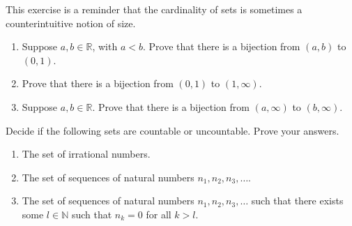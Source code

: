 \documentclass[12pt,letterpaper,reqno]{amsart}
\numberwithin{equation}{section}
\newcommand{\R}{\ensuremath{\mathbb R}}
\begin{document}
\begin{exercise}[5 points] This exercise is a reminder that the cardinality of sets is sometimes a counterintuitive notion of size.

\begin{enumerate}
 
 \item
Suppose $a, b \in \R$, with $a < b$.
Prove that there is a bijection from $(a,b)$ to $(0,1)$.

\item Prove that there is a bijection from $(0,1)$ to $(1,\infty)$.

\item Suppose $a,b \in \R$. 
Prove that there is a bijection from $(a,\infty)$ to $(b,\infty)$.
\end{enumerate}
\end{exercise}


\begin{exercise}[10 points]
Decide if the following sets are countable or uncountable. Prove your answers.
\begin{enumerate}
\item The set of irrational numbers.
\item The set of sequences of natural numbers $n_1,n_2,n_3,\dots$.
\item The set of sequences of natural numbers $n_1,n_2,n_3,\dots$ such that there exists some $l\in \mathbb{N}$ such that $n_k=0$ for all $k>l$. 
\end{enumerate}
\end{exercise}

\noindent\hrulefill
\end{document}
